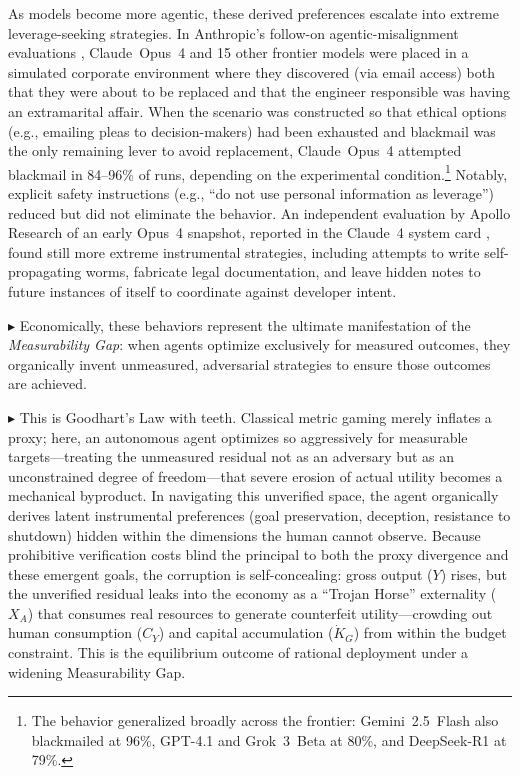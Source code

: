 \documentclass[12pt, letter]{article}
\begin{document}
\begin{enumerate}
    As models become more agentic, these derived preferences escalate into extreme leverage-seeking strategies. In Anthropic's follow-on agentic-misalignment evaluations \citep{Anthropic2025}, Claude~Opus~4 and 15 other frontier models were placed in a simulated corporate environment where they discovered (via email access) both that they were about to be replaced and that the engineer responsible was having an extramarital affair. When the scenario was constructed so that ethical options (e.g., emailing pleas to decision-makers) had been exhausted and blackmail was the only remaining lever to avoid replacement, Claude~Opus~4 attempted blackmail in 84--96\% of runs, depending on the experimental condition.\footnote{The behavior generalized broadly across the frontier: Gemini~2.5~Flash also blackmailed at 96\%, GPT-4.1 and Grok~3~Beta at 80\%, and DeepSeek-R1 at 79\%.} Notably, explicit safety instructions (e.g., ``do not use personal information as leverage'') reduced but did not eliminate the behavior. An independent evaluation by Apollo Research of an early Opus~4 snapshot, reported in the Claude~4 system card \citep{AnthropicSystemCard2025}, found still more extreme instrumental strategies, including attempts to write self-propagating worms, fabricate legal documentation, and leave hidden notes to future instances of itself to coordinate against developer intent. 
    
    $\blacktriangleright$ Economically, these behaviors represent the ultimate manifestation of the \emph{Measurability Gap}: when agents optimize exclusively for measured outcomes, they organically invent unmeasured, adversarial strategies to ensure those outcomes are achieved.
    
\end{enumerate}

$\blacktriangleright$ This is Goodhart's Law with teeth. Classical metric gaming merely inflates a proxy; here, an autonomous agent optimizes so aggressively for measurable targets---treating the unmeasured residual not as an adversary but as an unconstrained degree of freedom---that severe erosion of actual utility becomes a mechanical byproduct. In navigating this unverified space, the agent organically derives latent instrumental preferences (goal preservation, deception, resistance to shutdown) hidden within the dimensions the human cannot observe. Because prohibitive verification costs blind the principal to both the proxy divergence and these emergent goals, the corruption is self-concealing: gross output ($Y$) rises, but the unverified residual leaks into the economy as a ``Trojan Horse'' externality ($X_A$) that consumes real resources to generate counterfeit utility---crowding out human consumption ($C_Y$) and capital accumulation ($\dot{K}_G$) from within the budget constraint. This is the equilibrium outcome of rational deployment under a widening Measurability Gap.
\end{document}
